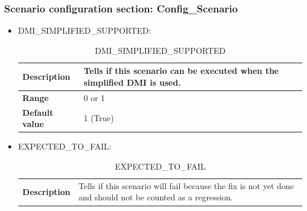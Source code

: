 \documentclass{template/openetcs}
\begin{document}
\subsubsection{Scenario configuration section: Config\_Scenario}
	\begin{itemize}
			\item DMI\_SIMPLIFIED\_SUPPORTED:
											
			\begin{longtable}{|l|l|}
				\caption{DMI\_SIMPLIFIED\_SUPPORTED}\\ 
				\hline
				
					\begin{minipage}[t]{0.22\linewidth} \textbf{Description}	\end{minipage} 
				&	\begin{minipage}[t]{0.78\linewidth} Tells if this scenario can be executed when the simplified DMI is used. \end{minipage} \\
				
				\hline
																																									
					\begin{minipage}[t]{0.22\linewidth} \textbf{Range}	\end{minipage} 
				&	\begin{minipage}[t]{0.78\linewidth} 0 or 1 \end{minipage} \\
				
				\hline
				
					\begin{minipage}[t]{0.22\linewidth} \textbf{Default value}	\end{minipage} 
				&	\begin{minipage}[t]{0.78\linewidth} 1 (True) \end{minipage} \\
				
				\hline				
			\end{longtable}
			
			\item EXPECTED\_TO\_FAIL:
											
			\begin{longtable}{|l|l|}
				\caption{EXPECTED\_TO\_FAIL}\\ 
				\hline
				
					\begin{minipage}[t]{0.22\linewidth} \textbf{Description}	\end{minipage} 
				&	\begin{minipage}[t]{0.78\linewidth} Tells if this scenario will fail because the fix is not yet done and should not be counted as a regression. \end{minipage} \\
				

\end{longtable}
\end{itemize}
\end{document}
